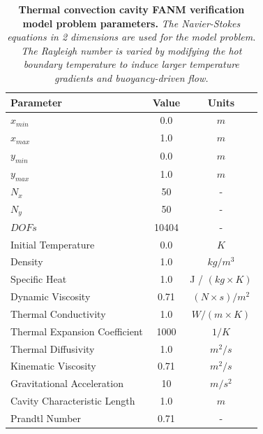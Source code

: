 \begin{table}[h!]
  \begin{center}
    \begin{tabular}{lcc}\hline\hline
      \multicolumn{1}{l}{Parameter}& 
      \multicolumn{1}{c}{Value}&
      \multicolumn{1}{c}{Units}\\\hline
      $x_{min}$ & 0.0 & $m$ \\
      $x_{max}$ & 1.0 & $m$ \\
      $y_{min}$ & 0.0 & $m$ \\
      $y_{max}$ & 1.0 & $m$ \\
      $N_x$ & 50 & - \\
      $N_y$ & 50 & - \\
      $DOFs$ & 10404 & - \\
      Initial Temperature & 0.0 & $K$ \\
      Density & 1.0 & $kg / m^3$ \\
      Specific Heat & 1.0 & J / $(kg \times K)$ \\
      Dynamic Viscosity & 0.71 & $(N \times s) / m^2$ \\
      Thermal Conductivity & 1.0 & $W / (m \times K)$ \\
      Thermal Expansion Coefficient & 1000 & $1 / K$ \\
      Thermal Diffusivity & 1.0 & $m^2 / s$ \\
      Kinematic Viscosity & 0.71 & $m^2 / s$ \\
      Gravitational Acceleration & 10 & $m / s^2$ \\
      Cavity Characteristic Length & 1.0 & $m$ \\
      Prandtl Number & 0.71 & - \\
      \hline\hline
    \end{tabular}
  \end{center}
  \caption{\textbf{Thermal convection cavity FANM verification model
      problem parameters.}  \textit{The Navier-Stokes equations in 2
      dimensions are used for the model problem. The Rayleigh number
      is varied by modifying the hot boundary temperature to induce
      larger temperature gradients and buoyancy-driven flow.}}
  \label{tab:thermal_convection_parameters}
\end{table}


